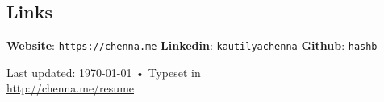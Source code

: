 \documentclass[letterpaper, margin, line, 10.5pt]{resume}
\begin{document}
\begin{resume}
	
	\sectionseperator
    \section{\myheadingstyle Links}
	\textbf{Website}: \texttt{\href{https://chenna.me}{https://chenna.me}} \hspace{2mm}%
    \textbf{Linkedin}: \texttt{\href{https://www.linkedin.com/in/kautilyachenna/}{kautilyachenna}} \hspace{2mm}%
    \textbf{Github}: \texttt{\href{https://github.com/hashb}{hashb}}
    \vspace{-3.2mm}

\begin{center}
	{\scriptsize  Last updated: \today\- •\- Typeset in \href{}{
			\XeTeX }\\
		\href{http://chenna.me/resume}{http://chenna.me/resume}}
\end{center}

\end{resume}
\end{document}
